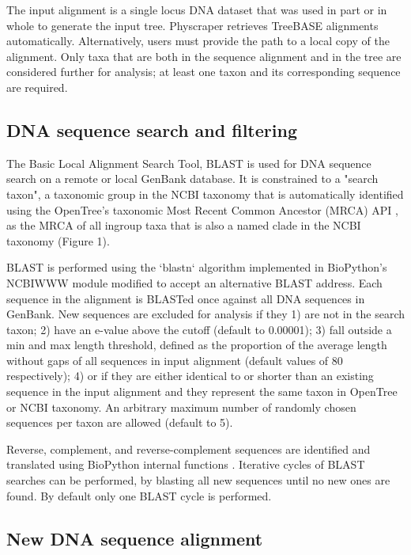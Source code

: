\documentclass{bmcart}
\providecommand{\DIFaddtex}[1]{{\protect\color{blue}\uwave{#1}}} %
\providecommand{\DIFaddbegin}{} %
\providecommand{\DIFaddend}{} %
\providecommand{\DIFadd}[1]{\texorpdfstring{\DIFaddtex{#1}}{#1}} %
\begin{document}
The input alignment is a single locus DNA dataset that was used in part or in
whole to generate the input tree. Physcraper retrieves TreeBASE alignments
automatically. Alternatively, users must provide the path to a local copy of the
alignment.
Only taxa that are both in the sequence alignment and in the tree are considered
further for analysis; at least one taxon and its corresponding sequence are required.

\subsection*{DNA sequence search and filtering}

The Basic Local Alignment Search Tool, BLAST \cite{altschul1990basic} is used for DNA
sequence search on a remote or local GenBank database. It is constrained to a
"search taxon", a taxonomic group in the NCBI taxonomy that is automatically
identified using the OpenTree's taxonomic Most Recent Common Ancestor (MRCA) API
\cite{mrcaAPI, rees2017automated}, as the MRCA of all ingroup taxa that is
also a named clade in the NCBI taxonomy (Figure 1).

BLAST is performed using the `blastn` algorithm \cite{camacho2009blast}
implemented in BioPython's \cite{cock2009biopython} NCBIWWW module \cite{ncbiwww}
modified to accept an alternative BLAST address.
Each sequence in the alignment is BLASTed once against all DNA sequences in GenBank.
New sequences are excluded for analysis if they 1) are not in the search taxon;
2) have an e-value above the cutoff (default to 0.00001); 3) fall outside a min
and max length threshold, defined as the proportion of the average length without
gaps of all sequences in input alignment (default values of 80%
\DIFaddbegin \DIFadd{\% and 120\%,
}\DIFaddend respectively); 4) or if they are either identical to or shorter than an existing
sequence in the input alignment and they represent the same taxon in OpenTree or
NCBI taxonomy.
An arbitrary maximum number of randomly chosen sequences per taxon are allowed
(default to 5).

Reverse, complement, and reverse-complement sequences are identified and translated
using BioPython internal functions \cite{cock2009biopython}.
Iterative cycles of BLAST searches can be performed, by blasting all new sequences
until no new ones are found. By default only one BLAST cycle is performed.

\subsection*{New DNA sequence alignment}
\end{document}
